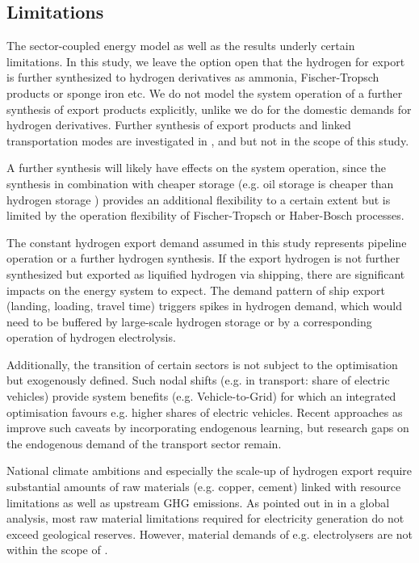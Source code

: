 \subsection*{Limitations}
\label{subsec:limitations}

The sector-coupled energy model as well as the results underly certain limitations. In this study, we leave the option open that the hydrogen for export is further synthesized to hydrogen derivatives as ammonia, Fischer-Tropsch products or sponge iron etc. We do not model the system operation of a further synthesis of export products explicitly, unlike we do for the domestic demands for hydrogen derivatives. Further synthesis of export products and linked transportation modes are investigated in \cite{Hampp2023}, \cite{Galimova2023} and \cite{Verpoort2023} but not in the scope of this study.

A further synthesis will likely have effects on the system operation, since the synthesis in combination with cheaper storage (e.g. oil storage is cheaper than hydrogen storage \cite{DEA2019TechnologyData}) provides an additional flexibility to a certain extent but is limited by the operation flexibility of Fischer-Tropsch or Haber-Bosch processes.

The constant hydrogen export demand assumed in this study represents pipeline operation or a further hydrogen synthesis.
If the export hydrogen is not further synthesized but exported as liquified hydrogen via shipping, there are significant impacts on the energy system to expect. The demand pattern of ship export (landing, loading, travel time) triggers spikes in hydrogen demand, which would need to be buffered by large-scale hydrogen storage or by a corresponding operation of hydrogen electrolysis. 


Additionally, the transition of certain sectors is not subject to the optimisation but exogenously defined. Such nodal shifts (e.g. in transport: share of electric vehicles) provide system benefits (e.g. Vehicle-to-Grid) for which an integrated optimisation favours e.g. higher shares of electric vehicles.
Recent approaches as \cite{Zeyen2023} improve such caveats by incorporating endogenous learning, but research gaps on the endogenous demand of the transport sector remain.

National climate ambitions and especially the scale-up of hydrogen export require substantial amounts of raw materials (e.g. copper, cement) linked with resource limitations as well as upstream GHG emissions. As pointed out in \cite{Wang2023} in a global analysis, most raw material limitations required for electricity generation do not exceed geological reserves. However, material demands of e.g. electrolysers are not within the scope of \cite{Wang2023}.


